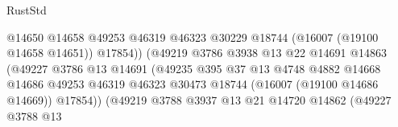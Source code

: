 \begin{lexlean}{RustStd}
\begin{coremodule}
                                                  @14650
                                                  @14658
                                                  @49253
                                                  @46319
                                                  @46323
                                                  @30229
                                                  @18744
                                                  (@16007 (@19100 @14658 @14651))
                                                  @17854))
                                              (@49219
                                                @3786
                                                @3938
                                                @13
                                                @22
                                                @14691
                                                @14863
                                                (@49227
                                                  @3786
                                                  @13
                                                  @14691
                                                  (@49235
                                                    @395
                                                    @37
                                                    @13
                                                    @4748
                                                    @4882
                                                    @14668
                                                    @14686
                                                    @49253
                                                    @46319
                                                    @46323
                                                    @30473
                                                    @18744
                                                    (@16007 (@19100 @14686 @14669))
                                                    @17854))
                                                (@49219
                                                  @3788
                                                  @3937
                                                  @13
                                                  @21
                                                  @14720
                                                  @14862
                                                  (@49227
                                                    @3788
                                                    @13

\end{coremodule}
\end{lexlean}
